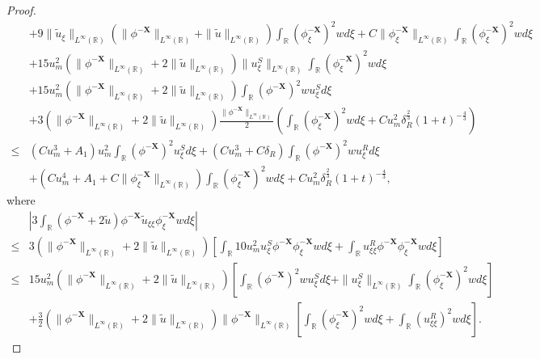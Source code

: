 \documentclass[10pt,reqno]{amsart}
\numberwithin{equation}{section}
\begin{document}
\begin{proof}
\begin{align*}
			&+9\|\tilde{u}_{\xi}\|_{L^{\infty}(\mathbb{R})}\left(\|\phi^{-\mathbf{X}}\|_{L^{\infty}(\mathbb{R})}+\|\tilde{u}\|_{L^{\infty}(\mathbb{R})}\right)\int_{\mathbb{R}}(\phi_{\xi}^{-\mathbf{X}})^{2}wd\xi+C\|\phi_{\xi}^{-\mathbf{X}}\|_{L^{\infty}(\mathbb{R})}\int_{\mathbb{R}}(\phi_{\xi}^{-\mathbf{X}})^{2}wd\xi\\
			&+15u_m^2\left(\|\phi^{-\mathbf{X}}\|_{L^{\infty}(\mathbb{R})}+2\|\tilde{u}\|_{L^{\infty}(\mathbb{R})}\right)\|u^S_{\xi}\|_{L^{\infty}(\mathbb{R})}\int_{\mathbb{R}}(\phi_{\xi}^{-\mathbf{X}})^{2}wd\xi\\
			&+15u_m^2\left(\|\phi^{-\mathbf{X}}\|_{L^{\infty}(\mathbb{R})}+2\|\tilde{u}\|_{L^{\infty}(\mathbb{R})}\right)\int_{\mathbb{R}}(\phi^{-\mathbf{X}})^2wu_{\xi}^Sd\xi\\
			&+3\left(\|\phi^{-\mathbf{X}}\|_{L^{\infty}(\mathbb{R})}+2\|\tilde{u}\|_{L^{\infty}(\mathbb{R})}\right)\frac{\|\phi^{-\mathbf{X}}\|_{L^{\infty}(\mathbb{R})}}{2}\left(\int_{\mathbb{R}}(\phi_{\xi}^{-\mathbf{X}})^{2}wd\xi+Cu_m^2\delta_{R}^{\frac{2}{3}}(1+t)^{-\frac{4}{3}}\right)\\
			\leq&(Cu_m^3+A_1)u_m^2\int_{\mathbb{R}}(\phi^{-\mathbf{X}})^2u^S_{\xi}d\xi+(Cu_m^3+C\delta_R)\int_{\mathbb{R}}(\phi^{-\mathbf{X}})^2wu^R_{\xi}d\xi\\
			&+(Cu_m^4+A_1+C\|\phi_{\xi}^{-\mathbf{X}}\|_{L^{\infty}(\mathbb{R})})\int_{\mathbb{R}}(\phi_{\xi}^{-\mathbf{X}})^{2}wd\xi+Cu_m^2\delta_{R}^{\frac{2}{3}}(1+t)^{-\frac{4}{3}},
		\end{align*}
		where
		\begin{align*}
			&\left|3\int_{\mathbb{R}}(\phi^{-\mathbf{X}}+2\tilde{u})\phi^{-\mathbf{X}}\tilde{u}_{\xi\xi}\phi_{\xi}^{-\mathbf{X}}wd\xi\right|\\
			\leq&3\left(\|\phi^{-\mathbf{X}}\|_{L^{\infty}(\mathbb{R})}+2\|\tilde{u}\|_{L^{\infty}(\mathbb{R})}\right)\left[\int_{\mathbb{R}}10u_m^2u_{\xi}^S\phi^{-\mathbf{X}}\phi_{\xi}^{-\mathbf{X}}wd\xi+\int_{\mathbb{R}}u_{\xi\xi}^R\phi^{-\mathbf{X}}\phi_{\xi}^{-\mathbf{X}}wd\xi\right]\\
			\leq&15u_m^2\left(\|\phi^{-\mathbf{X}}\|_{L^{\infty}(\mathbb{R})}+2\|\tilde{u}\|_{L^{\infty}(\mathbb{R})}\right)\left[\int_{\mathbb{R}}(\phi^{-\mathbf{X}})^2wu_{\xi}^Sd\xi+\|u^S_{\xi}\|_{L^{\infty}(\mathbb{R})}\int_{\mathbb{R}}(\phi_{\xi}^{-\mathbf{X}})^2wd\xi\right]\\
			&+\frac{3}{2}\left(\|\phi^{-\mathbf{X}}\|_{L^{\infty}(\mathbb{R})}+2\|\tilde{u}\|_{L^{\infty}(\mathbb{R})}\right)\|\phi^{-\mathbf{X}}\|_{L^{\infty}(\mathbb{R})}\left[\int_{\mathbb{R}}(\phi_{\xi}^{-\mathbf{X}})^2wd\xi+\int_{\mathbb{R}}(u_{\xi\xi}^R)^2wd\xi\right].

\end{align*}
\end{proof}
\end{document}
